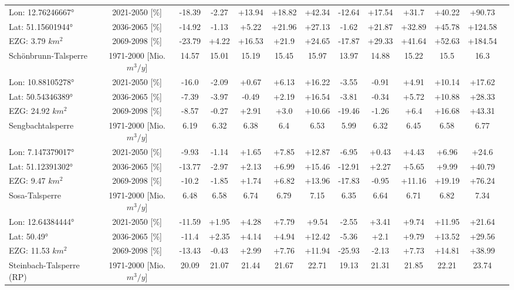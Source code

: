 \begin{longtable}{@{\extracolsep{\fill}}lc|ccccc||cccccc}
\cline{2-12} 
Lon: 12.76246667° & 2021-2050 [\%]  & -18.39 & -2.27 & +13.94 & +18.82 & +42.34 & -12.64 & +17.54 & +31.7 & +40.22 & +90.73\\ 
Lat: 51.15601944° & 2036-2065 [\%]  & -14.92 & -1.13 & +5.22 & +21.96 & +27.13 & -1.62 & +21.87 & +32.89 & +45.78 & +124.58\\ 
EZG: 3.79 $km^2$ & 2069-2098 [\%]  & -23.79 & +4.22 & +16.53 & +21.9 & +24.65 & -17.87 & +29.33 & +41.64 & +52.63 & +184.54\\ 
\hline 
Schönbrunn-Talsperre & 1971-2000 [Mio. $m^3/y$]  & 14.57 & 15.01 & 15.19 & 15.45 & 15.97 & 13.97 & 14.88 & 15.22 & 15.5 & 16.3\\ 
\cline{2-12} 
Lon: 10.88105278° & 2021-2050 [\%]  & -16.0 & -2.09 & +0.67 & +6.13 & +16.22 & -3.55 & -0.91 & +4.91 & +10.14 & +17.62\\ 
Lat: 50.54346389° & 2036-2065 [\%]  & -7.39 & -3.97 & -0.49 & +2.19 & +16.54 & -3.81 & -0.34 & +5.72 & +10.88 & +28.33\\ 
EZG: 24.92 $km^2$ & 2069-2098 [\%]  & -8.57 & -0.27 & +2.91 & +3.0 & +10.66 & -19.46 & -1.26 & +6.4 & +16.68 & +43.31\\ 
\hline 
Sengbachtalsperre & 1971-2000 [Mio. $m^3/y$]  & 6.19 & 6.32 & 6.38 & 6.4 & 6.53 & 5.99 & 6.32 & 6.45 & 6.58 & 6.77\\ 
\cline{2-12} 
Lon: 7.147379017° & 2021-2050 [\%]  & -9.93 & -1.14 & +1.65 & +7.85 & +12.87 & -6.95 & +0.43 & +4.43 & +6.96 & +24.6\\ 
Lat: 51.12391302° & 2036-2065 [\%]  & -13.77 & -2.97 & +2.13 & +6.99 & +15.46 & -12.91 & +2.27 & +5.65 & +9.99 & +40.79\\ 
EZG: 9.47 $km^2$ & 2069-2098 [\%]  & -10.2 & -1.85 & +1.74 & +6.82 & +13.96 & -17.83 & -0.95 & +11.16 & +19.19 & +76.24\\ 
\hline 
Sosa-Talsperre & 1971-2000 [Mio. $m^3/y$]  & 6.48 & 6.58 & 6.74 & 6.79 & 7.15 & 6.35 & 6.64 & 6.71 & 6.82 & 7.34\\ 
\cline{2-12} 
Lon: 12.64384444° & 2021-2050 [\%]  & -11.59 & +1.95 & +4.28 & +7.79 & +9.54 & -2.55 & +3.41 & +9.74 & +11.95 & +21.64\\ 
Lat: 50.49° & 2036-2065 [\%]  & -11.4 & +2.35 & +4.14 & +4.94 & +12.42 & -5.36 & +2.1 & +9.79 & +13.52 & +29.56\\ 
EZG: 11.53 $km^2$ & 2069-2098 [\%]  & -13.43 & -0.43 & +2.99 & +7.76 & +11.94 & -25.93 & -2.13 & +7.73 & +14.81 & +38.99\\ 
\hline 
Steinbach-Talsperre (RP) & 1971-2000 [Mio. $m^3/y$]  & 20.09 & 21.07 & 21.44 & 21.67 & 22.71 & 19.13 & 21.31 & 21.85 & 22.21 & 23.74\\ 

\end{longtable}
